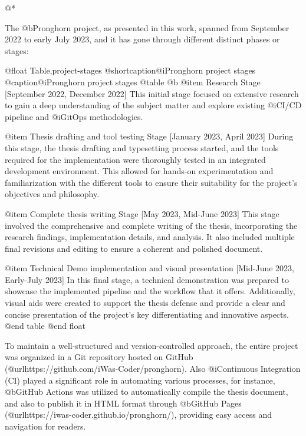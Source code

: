 @*

The @b{Pronghorn} project, as presented in this work, spanned from September 2022 to early July 2023, and it has gone through different distinct phases or stages:

@float Table,project-stages
@shortcaption{@i{Pronghorn} project stages}
@caption{@i{Pronghorn} project stages}
@table @b
@item Research Stage [September 2022, December 2022]
This initial stage focused on extensive research to gain a deep understanding of the subject matter and explore existing @i{CI/CD pipeline} and @i{GitOps} methodologies.

@item Thesis drafting and tool testing Stage [January 2023, April 2023]
During this stage, the thesis drafting and typesetting process started, and the tools required for the implementation were thoroughly tested in an integrated development environment. This allowed for hands-on experimentation and familiarization with the different tools to ensure their suitability for the project's objectives and philosophy.

@item Complete thesis writing Stage [May 2023, Mid-June 2023]
This stage involved the comprehensive and complete writing of the thesis, incorporating the research findings, implementation details, and analysis. It also included multiple final revisions and editing to ensure a coherent and polished document.

@item Technical Demo implementation and visual presentation [Mid-June 2023, Early-July 2023]
In this final stage, a technical demonstration was prepared to showcase the implemented pipeline and the workflow that it offers. Additionally, visual aids were created to support the thesis defense and provide a clear and concise presentation of the project's key differentiating and innovative aspects.
@end table
@end float

To maintain a well-structured and version-controlled approach, the entire project was organized in a Git repository hosted on GitHub (@url{https://github.com/iWas-Coder/pronghorn}). Also @i{Continuous Integration (CI)} played a significant role in automating various processes, for instance, @b{GitHub Actions} was utilized to automatically compile the thesis document, and also to publish it in HTML format through @b{GitHub Pages} (@url{https://iwas-coder.github.io/pronghorn/}), providing easy access and navigation for readers.
